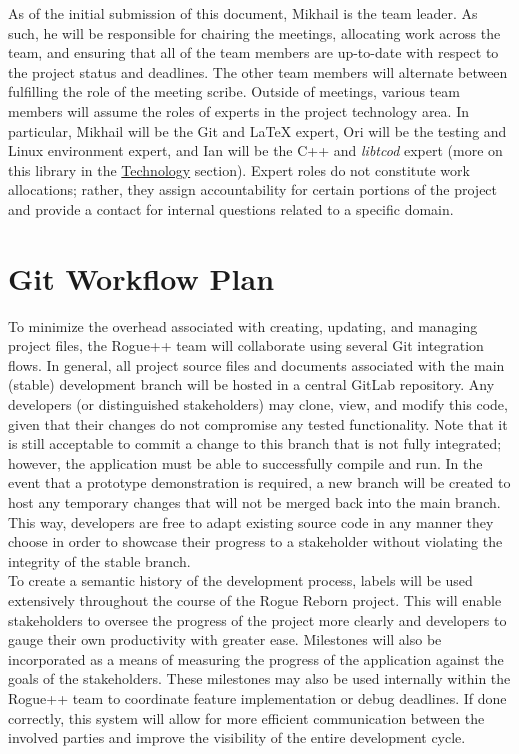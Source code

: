 \documentclass{article}
\begin{document}
\indent
As of the initial submission of this document, Mikhail is the team leader.  As such, he will be responsible for chairing the meetings, allocating work across the team, and ensuring that all of the team members are up-to-date with respect to the project status and deadlines.  The other team members will alternate between fulfilling the role of the meeting scribe. Outside of meetings, various team members will assume the roles of experts in the project technology area.  In particular, Mikhail will be the Git and LaTeX expert, Ori will be the testing and Linux environment expert, and Ian will be the C++ and \textit{libtcod} expert (more on this library in the \hyperref[tech_label]{Technology} section).  Expert roles do not constitute work allocations; rather, they assign accountability for certain portions of the project and provide a contact for internal questions related to a specific domain.

\section{Git Workflow Plan}
\label{workflow_label}

\indent
To minimize the overhead associated with creating, updating, and managing project files, the Rogue++ team will collaborate using several Git integration flows.  In general, all project source files and documents associated with the main (stable) development branch will be hosted in a central GitLab repository.  Any developers (or distinguished stakeholders) may clone, view, and modify this code, given that their changes do not compromise any tested functionality.  Note that it is still acceptable to commit a change to this branch that is not fully integrated; however, the application must be able to successfully compile and run.  In the event that a prototype demonstration is required, a new branch will be created to host any temporary changes that will not be merged back into the main branch.  This way, developers are free to adapt existing source code in any manner they choose in order to showcase their progress to a stakeholder without violating the integrity of the stable branch.\\

To create a semantic history of the development process, labels will be used extensively throughout the course of the Rogue Reborn project.  This will enable stakeholders to oversee the progress of the project more clearly and developers to gauge their own productivity with greater ease.  Milestones will also be incorporated as a means of measuring the progress of the application against the goals of the stakeholders.  These milestones may also be used internally within the Rogue++ team to coordinate feature implementation or debug deadlines. If done correctly, this system will allow for more efficient communication between the involved parties and improve the visibility of the entire development cycle.
\end{document}
